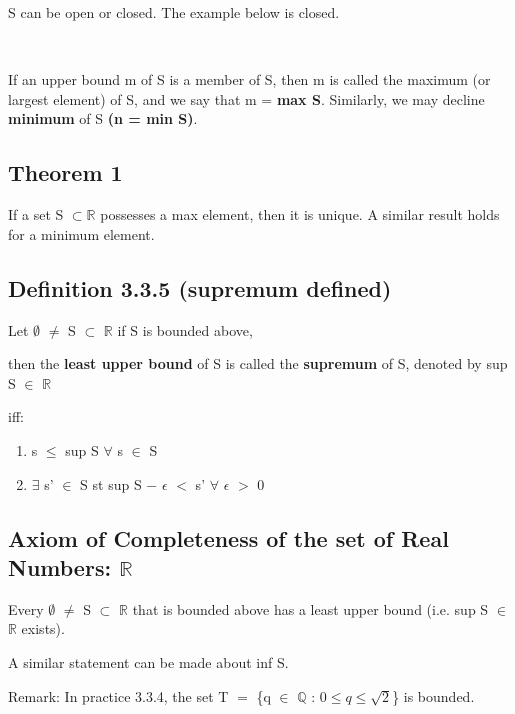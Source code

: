 \documentclass{article}
\newcommand{\mt}[1]{\ensuremath{#1}}
\newcommand\ssc[2][\DefaultOpt]{%
  \def\DefaultOpt{#2}%
  \subsection[#1]{#2}%
}
\newcommand{\balist}{\begin{enumerate}[label=\alph*.]}
\newcommand{\elist}{\end{enumerate}}
\newcommand{\br}{\mt{\mathbb{R}} }       %
\newcommand{\bq}{\mt{\mathbb{Q}} }       %
\newcommand{\ep}{\mt{\epsilon} }         %
\newcommand{\fa}{\mt{\forall} }          %
\newcommand{\mem}{\mt{\in} }
\newcommand{\exs}{\mt{\exists} }
\newcommand{\es}{\mt{\emptyset} }        %
\newcommand{\sbs}{\mt{\subset} }         %
\newcommand{\eql}{\mt{=} }
\begin{document}
{{{S can be open or closed. The example below is closed.

\


If an upper bound m of S is a member of S, then m is called the maximum (or largest element) of S, and we say that m = \textbf{max S}. Similarly, we may decline \textbf{minimum} of S \textbf{(n = min S)}.

}

\ssc{Theorem 1}{
If a set S $\sbs \br$ possesses a max element, then it is unique. A similar result holds for a minimum element.
}

\ssc{Definition 3.3.5 (supremum defined)}{
Let \es $\neq$ S \sbs \br if S is bounded above, \

then the \textbf{least upper bound} of S is called the \textbf{supremum} of S, denoted by sup S \mem \br \

iff: \

\balist
\item s $\leq$ sup S \fa s \mem S
\item \exs s' \mem S st sup S $-$ \ep $<$ s' \fa \ep $>$ 0
\elist

}

\ssc{Axiom of Completeness of the set of Real Numbers: \br}{
Every \es $\neq$ S \sbs \br that is bounded above has a least upper bound (i.e. sup S \mem \br exists). \

A similar statement can be made about inf S.
}

Remark: In practice 3.3.4, the set T \eql \{q \mem \bq : $0 \leq q \leq \sqrt{2}$\} is bounded.

\

}}
\end{document}
